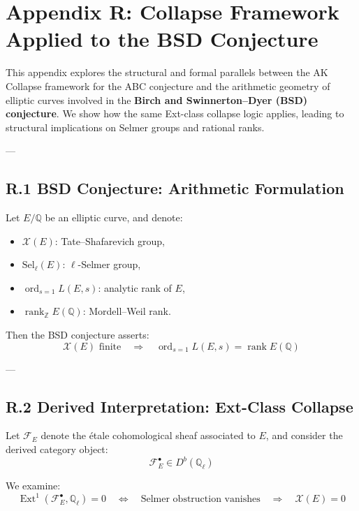 \documentclass[11pt]{article}
\DeclareMathOperator{\Ext}{Ext}
\newcommand{\Sha}{\mathcal{X}}
\begin{document}
\section*{Appendix R: Collapse Framework Applied to the BSD Conjecture}

This appendix explores the structural and formal parallels between the AK Collapse framework for the ABC conjecture  
and the arithmetic geometry of elliptic curves involved in the \textbf{Birch and Swinnerton–Dyer (BSD) conjecture}.  
We show how the same Ext-class collapse logic applies, leading to structural implications on Selmer groups  
and rational ranks.

---

\subsection*{R.1 BSD Conjecture: Arithmetic Formulation}

Let \( E/\mathbb{Q} \) be an elliptic curve, and denote:
\begin{itemize}
  \item \( \Sha(E) \): Tate–Shafarevich group,
  \item \( \mathrm{Sel}_\ell(E) \): \( \ell \)-Selmer group,
  \item \( \operatorname{ord}_{s=1} L(E,s) \): analytic rank of \( E \),
  \item \( \operatorname{rank}_{\mathbb{Z}} E(\mathbb{Q}) \): Mordell–Weil rank.
\end{itemize}

Then the BSD conjecture asserts:
\[
\boxed{
\Sha(E) \text{ finite} \quad \Rightarrow \quad \operatorname{ord}_{s=1} L(E,s) = \operatorname{rank} E(\mathbb{Q})
}
\]

---

\subsection*{R.2 Derived Interpretation: Ext-Class Collapse}

Let \( \mathcal{F}_E \) denote the étale cohomological sheaf associated to \( E \), and consider the derived category object:
\[
\mathcal{F}_E^\bullet \in D^b(\mathbb{Q}_\ell)
\]

We examine:
\[
\Ext^1(\mathcal{F}_E^\bullet, \mathbb{Q}_\ell) = 0
\quad \Leftrightarrow \quad \text{Selmer obstruction vanishes} \quad \Rightarrow \quad \Sha(E) = 0
\]
\end{document}
